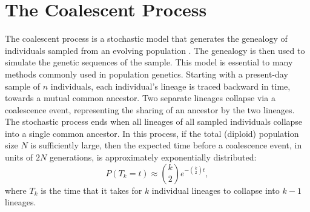 



\section{The Coalescent Process}

The coalescent process is a stochastic model that generates the genealogy of individuals sampled from an evolving population \cite{Wakeley:2009}.
The genealogy is then used to simulate the genetic sequences of the sample.
This model is essential to many methods commonly used in population genetics.
Starting with a present-day sample of $n$ individuals, each individual's lineage is traced backward in time, towards a mutual common ancestor.
Two separate lineages collapse via a coalescence event, representing the sharing of an ancestor by the two lineages.
The stochastic process ends when all lineages of all sampled individuals collapse into a single common ancestor.
In this process, if the total (diploid) population size $N$ is sufficiently large, then the expected time before a coalescence event, in units of $2N$ generations, is approximately exponentially distributed:
\begin{equation}
P(T_{k}=t) \approx \binom{k}{2} e ^{-\binom{k}{2} t},
\end{equation}
where $T_k$ is the time that it takes for $k$ individual lineages to collapse into $k-1$ lineages.

